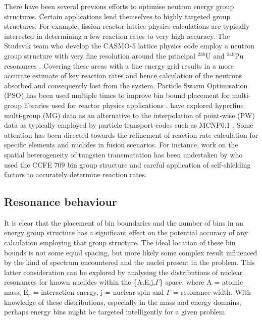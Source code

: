 There have been several previous efforts to optimise neutron energy group structures. Certain applications lend themselves to highly targeted group structures. For example, fission reactor lattice physics calculations are typically interested in determining a few reaction rates to very high accuracy. The Studsvik team who develop the CASMO-5 lattice physics code employ a neutron group structure with very fine resolution around the principal $^{238}\mathrm{U}$ and $^{240}\mathrm{Pu}$ resonances \cite{Rhodes2006}. Covering these areas with a fine energy grid results in a more accurate estimate of key reaction rates and hence calculation of the neutrons absorbed and consequently lost from the system. Particle Swarm Optimisation (PSO) has been used multiple times to improve bin bound placement for multi-group libraries used for reactor physics applications \cite{Yi2013} \cite{Akbari2012} \cite{Akbari2013} \cite{Fleming2016}. \citet{Morgan2013} have explored hyperfine multi-group (MG) data as an alternative to the interpolation of point-wise (PW) data as typically employed by particle transport codes such as MCNP6.1 \cite{Goorley2012}. Some attention has been directed towards the refinement of reaction rate calculation for specific elements and nuclides in fusion scenarios. For instance, work on the spatial heterogeneity of tungsten transmutation has been undertaken by \citet{Gilbert2016} who used the CCFE 709 bin group structure and careful application of self-shielding factors to accurately determine reaction rates.

\subsection{Resonance behaviour}
It is clear that the placement of bin boundaries and the number of bins in an energy group structure has a significant effect on the potential accuracy of any calculation employing that group structure. The ideal location of these bin bounds is not some equal spacing, but more likely some complex result influenced by the kind of spectrum encountered and the nuclei present in the problem. This latter consideration can be explored by analysing the distributions of nuclear resonances for known nuclides within the \{A,E,j,$\Gamma$\} space, where A = atomic mass, $\mathrm{E}_{r}$ = interaction energy, j = nuclear spin and $\Gamma$ = resonance width. With knowledge of these distributions, especially in the mass and energy domains, perhaps energy bins might be targeted intelligently for a given problem.

